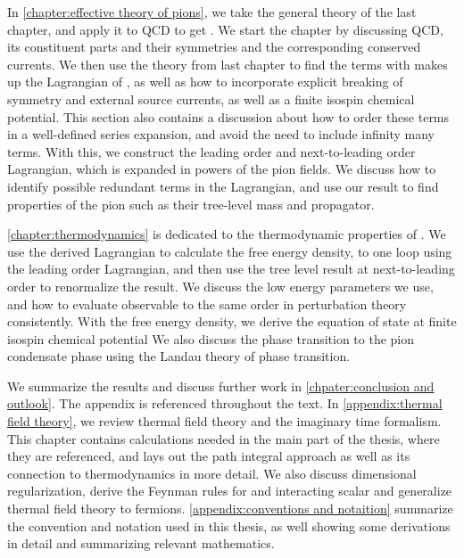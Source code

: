 In \autoref{chapter:effective theory of pions}, we take the general theory of the last chapter, and apply it to QCD to get \chpt.
We start the chapter by discussing QCD, its constituent parts and their symmetries and the corresponding conserved currents.
We then use the theory from last chapter to find the terms with makes up the Lagrangian of \chpt, as well as how to incorporate explicit breaking of symmetry and external source currents, as well as a finite isospin chemical potential.
This section also contains a discussion about how to order these terms in a well-defined series expansion, and avoid the need to include infinity many terms.
With this, we construct the leading order and next-to-leading order Lagrangian, which is expanded in powers of the pion fields.
We discuss how to identify possible redundant terms in the Lagrangian, and use our result to find properties of the pion such as their tree-level mass and propagator.

\autoref{chapter:thermodynamics} is dedicated to the thermodynamic properties of \chpt.
We use the derived Lagrangian to calculate the free energy density, to one loop using the leading order Lagrangian, and then use the tree level result at next-to-leading order to renormalize the result.
We discuss the low energy parameters we use, and how to evaluate observable to the same order in perturbation theory consistently.
With the free energy density, we derive the equation of state at finite isospin chemical potential
We also discuss the phase transition to the pion condensate phase using the Landau theory of phase transition.

We summarize the results and discuss further work in \autoref{chpater:conclusion and outlook}.
The appendix is referenced throughout the text.
In \autoref{appendix:thermal field theory}, we review thermal field theory and the imaginary time formalism.
This chapter contains calculations needed in the main part of the thesis, where they are referenced, and lays out the path integral approach as well as its connection to thermodynamics in more detail.
We also discuss dimensional regularization, derive the Feynman rules for and interacting scalar and generalize thermal field theory to fermions.
\autoref{appendix:conventions and notaition} summarize the convention and notation used in this thesis, as well showing some derivations in detail and summarizing relevant mathematics.


